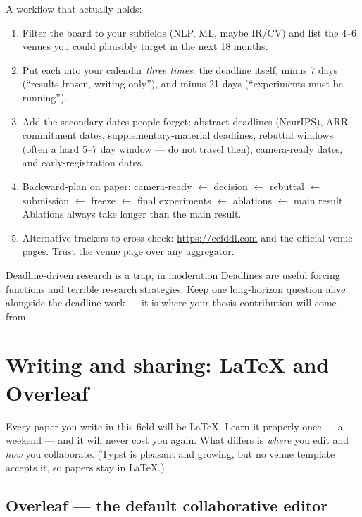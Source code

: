 \documentclass[11pt,a4paper]{article}
\begin{document}
A workflow that actually holds:

\begin{enumerate}
  \item Filter the board to your subfields (NLP, ML, maybe IR/CV) and list the
        4--6 venues you could plausibly target in the next 18 months.
  \item Put each into your calendar \emph{three times}: the deadline itself,
        minus 7 days (``results frozen, writing only''), and minus 21 days
        (``experiments must be running'').
  \item Add the secondary dates people forget: abstract deadlines (NeurIPS),
        ARR commitment dates, supplementary-material deadlines, rebuttal
        windows (often a hard 5--7 day window --- do not travel then),
        camera-ready dates, and early-registration dates.
  \item Backward-plan on paper: camera-ready $\leftarrow$ decision $\leftarrow$
        rebuttal $\leftarrow$ submission $\leftarrow$ freeze $\leftarrow$ final
        experiments $\leftarrow$ ablations $\leftarrow$ main result.
        Ablations always take longer than the main result.
  \item Alternative trackers to cross-check: \url{https://ccfddl.com} and the
        official venue pages. Trust the venue page over any aggregator.
\end{enumerate}

\begin{wbox}{Deadline-driven research is a trap, in moderation}
Deadlines are useful forcing functions and terrible research strategies. Keep
one long-horizon question alive alongside the deadline work --- it is where
your thesis contribution will come from.
\end{wbox}

\section{Writing and sharing: LaTeX and Overleaf}
\label{sec:writing}

Every paper you write in this field will be LaTeX. Learn it properly once ---
a weekend --- and it will never cost you again. What differs is \emph{where}
you edit and \emph{how} you collaborate. (Typst is pleasant and growing, but
no venue template accepts it, so papers stay in LaTeX.)

\subsection{Overleaf --- the default collaborative editor}
\end{document}

